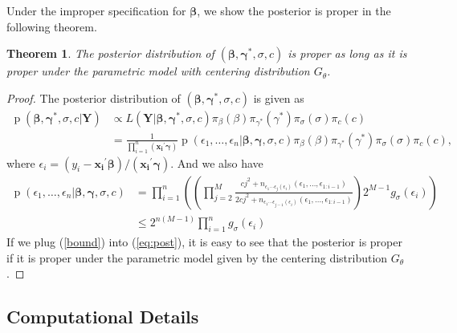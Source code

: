 \documentclass[12pt]{article}
\newtheorem{thm}{Theorem}[section]
\DeclareMathOperator{\pr}{p}
\begin{document}
Under the improper specification for ${\bm{\beta}}$, we show the posterior is proper in the following theorem.

\begin{thm}
The posterior distribution of $(\bm{\beta}, \bm{\gamma^{*}}, \sigma, c)$ is proper as long as it is proper under the parametric model with centering distribution $G_{\theta}$.
\end{thm}

\begin{proof}
The posterior distribution of $(\bm{\beta}, \bm{\gamma^{*}}, \sigma, c)$ is given as
\begin{equation}\label{eq:post}
  \begin{aligned}
    \pr(\bm{\beta}, \bm{\gamma^{*}}, \sigma, c|\bm{Y}) & \propto L(\bm{Y}|
    \bm{\beta}, \bm{\gamma^{*}}, \sigma, c) \pi_{\beta}(\beta)
    \pi_{\gamma^{*}}(\gamma^{*}) \pi_{\sigma}(\sigma) \pi_c(c) \\
    & = \frac{1}{\prod_{i=1}^n (\bm{x_i}^{\prime}\bm \gamma)} \pr \left(
      \epsilon_1, \ldots, \epsilon_n | \bm{\beta}, \bm{\gamma},
      \sigma, c\right) \pi_{\beta}(\beta)
    \pi_{\gamma^{*}}(\gamma^{*}) \pi_{\sigma}(\sigma) \pi_c(c),
  \end{aligned}
\end{equation}
where $\epsilon_i = (y_i - \bm{x_i}^{\prime}\bm\beta)/(\bm{x_i}^{\prime}\bm\gamma)$. And we also have
\begin{equation}\label{bound}
\begin{aligned}
\pr \left(\epsilon_1, \ldots, \epsilon_n | \bm{\beta}, \bm{\gamma}, \sigma, c\right) &
 = \prod_{i = 1}^{n} \left( \left(\prod_{j=2}^M \frac{cj^2 + n_{\epsilon_1 \cdots \epsilon_j(\epsilon_{i}) }(\epsilon_1, \ldots, \epsilon_{1:i-1})}{2cj^2+ n_{\epsilon_1 \cdots \epsilon_{j-1}(\epsilon_i)}(\epsilon_1, \ldots, \epsilon_{1:i-1})}    \right) 2^{M-1} g_{\sigma}(\epsilon_i) \right) \\
& \le 2^{n(M-1)} \prod_{i = 1}^n g_{\sigma}(\epsilon_i)
\end{aligned}
\end{equation}
If we plug (\ref{bound}) into (\ref{eq:post}), it is easy to see that the posterior is proper if it is proper under the parametric model given by the centering distribution $G_{\theta}$.
\end{proof}

\subsection{Computational Details}\label{ch2:sec:computation}
\end{document}
